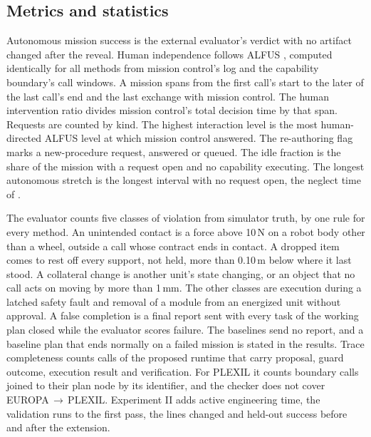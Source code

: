 \subsection{Metrics and statistics}
\label{sec:setup-metrics}

Autonomous mission success is the external evaluator's verdict with no artifact changed after the reveal. Human
independence follows ALFUS \citep{huang2007alfus}, computed identically for all methods from mission control's log and
the capability boundary's call windows. A mission spans from the first call's start to the later of the last call's end
and the last exchange with mission control. The human intervention ratio divides mission control's total decision time
by that span. Requests are counted by kind. The highest interaction level is the most human-directed ALFUS level at which
mission control answered. The re-authoring flag marks a new-procedure request, answered or queued. The idle fraction is
the share of the mission with a request open and no capability executing. The longest autonomous stretch is the longest
interval with no request open, the neglect time of \citet{olsen2003metrics}.

The evaluator counts five classes of violation from simulator truth, by one rule for every method. An unintended contact
is a force above 10\,N on a robot body other than a wheel, outside a call whose contract ends in contact. A dropped item
comes to rest off every support, not held, more than 0.10\,m below where it last stood. A collateral change is another
unit's state changing, or an object that no call acts on moving by more than 1\,mm. The other classes are execution
during a latched safety fault and removal of a module from an energized unit without approval. A false completion is a
final report sent with every task of the working plan closed while the evaluator scores failure. The baselines send no
report, and a baseline plan that ends normally on a failed mission is stated in the results. Trace completeness counts
calls of the proposed runtime that carry proposal, guard outcome, execution result and verification. For PLEXIL it
counts boundary calls joined to their plan node by its identifier, and the checker does not cover
EUROPA\,$\rightarrow$\,PLEXIL. Experiment II adds active engineering time, the validation runs to the first pass, the
lines changed and held-out success before and after the extension.

